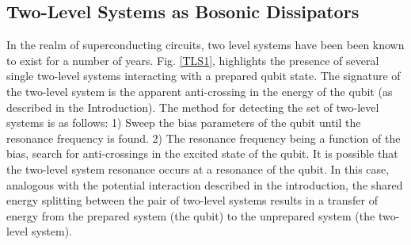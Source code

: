 \documentclass[aps,prl,reprint,groupedaddress]{revtex4-1}
\begin{document}
\subsection{Two-Level Systems as Bosonic Dissipators}

In the realm of superconducting circuits, two level systems have been been known to exist for a number of years. Fig. \ref{TLS1}, highlights the presence of several single two-level systems interacting with a prepared qubit state. The signature of the two-level system is the apparent anti-crossing in the energy of the qubit (as described in the Introduction). The method for detecting the set of two-level systems is as follows: 1) Sweep the bias parameters of the qubit until the resonance frequency is found. 2) The resonance frequency being a function of the bias, search for anti-crossings in the excited state of the qubit. It is possible that the two-level system resonance occurs at a resonance of the qubit. In this case, analogous with the potential interaction described in the introduction, the shared energy splitting between the pair of two-level systems results in a transfer of energy from the prepared system (the qubit) to the unprepared system (the two-level system).
\end{document}
